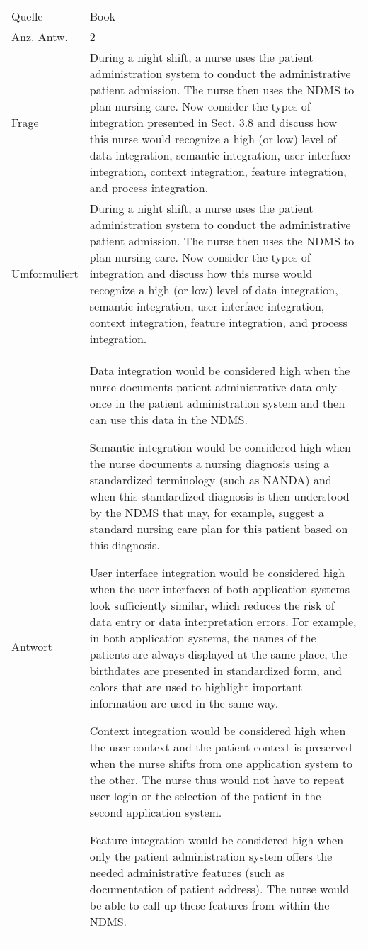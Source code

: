 \begin{landscape}
\begin{longtable}{p{3cm}p{}}
    Quelle & Book \\
    Anz. Antw. & 2 \\
    \midrule
    Frage & During a night shift, a nurse uses the patient administration system to conduct the administrative patient admission.
    The nurse then uses the NDMS to plan nursing care.
    Now consider the types of integration presented in Sect. 3.8 and discuss how this nurse would recognize a high (or low) level of data integration, semantic integration, user interface integration, context integration, feature integration, and process integration.\\
    Umformuliert & During a night shift, a nurse uses the patient administration system to conduct the administrative patient admission.
    The nurse then uses the NDMS to plan nursing care.
    Now consider the types of integration and discuss how this nurse would recognize a high (or low) level of data integration, semantic integration, user interface integration, context integration, feature integration, and process integration.\\
    Antwort & Data integration would be considered high when the nurse documents patient administrative data only once in the patient administration system and then can use this data in the NDMS.

    Semantic integration would be considered high when the nurse documents a nursing diagnosis using a standardized terminology (such as NANDA) and when this standardized diagnosis is then understood by the NDMS that may, for example, suggest a standard nursing care plan for this patient based on this diagnosis.

    User interface integration would be considered high when the user interfaces of both application systems look sufficiently similar, which reduces the risk of data entry or data interpretation errors.
    For example, in both application systems, the names of the patients are always displayed at the same place, the birthdates are presented in standardized form, and colors that are used to highlight important information are used in the same way.

    Context integration would be considered high when the user context and the patient context is preserved when the nurse shifts from one application system to the other.
    The nurse thus would not have to repeat user login or the selection of the patient in the second application system.

    Feature integration would be considered high when only the patient administration system offers the needed administrative features (such as documentation of patient address). The nurse would be able to call up these features from within the NDMS.


\end{longtable}
\end{landscape}
